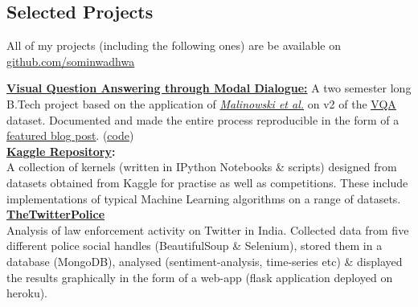 \documentclass[margin,line]{res}
\begin{document}
\begin{resume}
\section{\sc Selected Projects}
All of my projects (including the following ones) are be available on {\href{https://github.com/sominwadhwa}{\underline{github.com/sominwadhwa}}}

{\bf {\href{https://github.com/sominwadhwa/vqamd_floyd}{Visual Question Answering through Modal Dialogue:}}}
A two semester long B.Tech project based on the application of \textit{\href{https://arxiv.org/pdf/1505.01121.pdf}{Malinowski et al.}} on v2 of the {\href{http://visualqa.org/}{\underline{VQA}}} dataset. Documented and made the entire process reproducible in the form of a \href{https://blog.floydhub.com/asking-questions-to-images-with-deep-learning/}{\underline{featured blog post}}. ({\href{https://github.com/sominwadhwa/vqamd_floyd}{\underline{code}}})\\
{\bf {\href{https://github.com/sominwadhwa/Kaggle}{Kaggle Repository}:}}\\
A collection of kernels (written in IPython Notebooks \& scripts) designed from datasets obtained from Kaggle for practise as well as competitions. These include implementations of typical Machine Learning algorithms on a range of datasets.\\
{\bf {\href{https://github.com/sominwadhwa/TheTwitterPolice}{\color{blue} TheTwitterPolice}}}\\
Analysis of law enforcement activity on Twitter in India. Collected data from five different police social handles (BeautifulSoup \& Selenium), stored them in a database (MongoDB), analysed (sentiment-analysis, time-series etc) \& displayed the results graphically in the form of a web-app (flask application deployed on heroku).

\iffalse
\section{\sc Technical Skills}
{\bf Strongest Areas}: Machine Learning (Classification, Regression, Feature Engineering), Algorithms, Statistical Data Analysis\\
{\bf Languages/Tools/Software}: Python (scikit-learn, Keras, NumPy, Pandas \& others), Java, SQL, MongoDB, \LaTeX, MS Excel
\fi


\end{resume}
\end{document}
